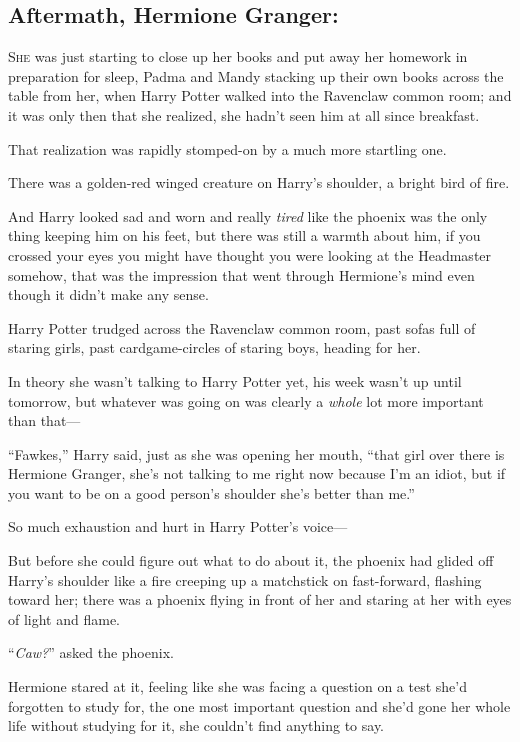 
\subsection{Aftermath, Hermione Granger:}

\lettrine{S}{he} was just starting to close up her books and put away her homework in preparation for sleep, Padma and Mandy stacking up their own books across the table from her, when Harry Potter walked into the Ravenclaw common room; and it was only then that she realized, she hadn’t seen him at all since breakfast.

That realization was rapidly stomped-on by a much more startling one.

There was a golden-red winged creature on Harry’s shoulder, a bright bird of fire.

And Harry looked sad and worn and really \emph{tired} like the phoenix was the only thing keeping him on his feet, but there was still a warmth about him, if you crossed your eyes you might have thought you were looking at the Headmaster somehow, that was the impression that went through Hermione’s mind even though it didn’t make any sense.

Harry Potter trudged across the Ravenclaw common room, past sofas full of staring girls, past cardgame-circles of staring boys, heading for her.

In theory she wasn’t talking to Harry Potter yet, his week wasn’t up until tomorrow, but whatever was going on was clearly a \emph{whole} lot more important than that—

“Fawkes,” Harry said, just as she was opening her mouth, “that girl over there is Hermione Granger, she’s not talking to me right now because I’m an idiot, but if you want to be on a good person’s shoulder she’s better than me.”

So much exhaustion and hurt in Harry Potter’s voice—

But before she could figure out what to do about it, the phoenix had glided off Harry’s shoulder like a fire creeping up a matchstick on fast-forward, flashing toward her; there was a phoenix flying in front of her and staring at her with eyes of light and flame.

“\emph{Caw?}” asked the phoenix.

Hermione stared at it, feeling like she was facing a question on a test she’d forgotten to study for, the one most important question and she’d gone her whole life without studying for it, she couldn’t find anything to say.

